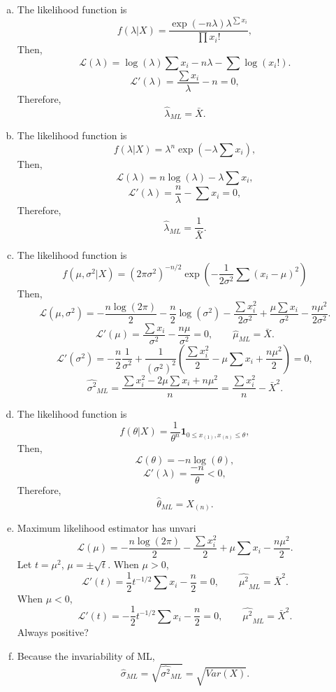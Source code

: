 \begin{solution}
    \begin{enumerate}[(a)]
        \item The likelihood function is 
        \[
            f(\lambda|X)=\frac{\exp(-n\lambda)\lambda^{\sum x_i}}{\prod x_i!}, 
        \]
        Then, 
        \[
            \mathcal{L}(\lambda)=\log(\lambda)\sum x_i-n\lambda-\sum \log(x_i!). 
        \]
        \[
            \mathcal{L}'(\lambda)=\frac{\sum x_i}{\lambda}-n=0, 
        \]
        Therefore, 
        \[
            \hat{\lambda}_{ML}=\bar{X}. 
        \]
        \item The likelihood function is 
        \[
            f(\lambda|X)=\lambda^n\exp\left(-\lambda\sum x_i\right), 
        \]
        Then, 
        \[
            \mathcal{L}(\lambda)=n\log(\lambda)-\lambda\sum x_i, 
        \]
        \[
            \mathcal{L}'(\lambda)=\frac{n}{\lambda}-\sum x_i=0, 
        \]
        Therefore, 
        \[
            \hat{\lambda}_{ML}=\frac{1}{\bar{X}}. 
        \]
        \item The likelihood function is 
        \[
            f(\mu, \sigma^2|X)=(2\pi\sigma^2)^{-n/2}\exp\left(-\frac{1}{2\sigma^2}\sum(x_i-\mu)^2\right)
        \]
        Then, 
        \[
            \mathcal{L}(\mu, \sigma^2) = -\frac{n\log(2\pi)}{2}-\frac{n}{2}\log(\sigma^2)-\frac{\sum x_i^2}{2\sigma^2}+\frac{\mu\sum x_i}{\sigma^2}-\frac{n\mu^2}{2\sigma^2}. 
        \]
        \[
            \mathcal{L}'(\mu)=\frac{\sum x_i}{\sigma^2}-\frac{n\mu}{\sigma^2}=0, \qquad \hat{\mu}_{ML}=\bar{X}. 
        \]
        \[
            \mathcal{L}'(\sigma^2)=-\frac{n}{2}\frac{1}{\sigma^2}+\frac{1}{(\sigma^2)^2}\left(\frac{\sum x_i^2}{2}-\mu\sum x_i+\frac{n\mu^2}{2}\right)=0, 
        \]
        \[
            \widehat{\sigma^2}_{ML}=\frac{\sum x_i^2-2\mu\sum x_i+n\mu^2}{n}=\frac{\sum x_i^2}{n}-\bar{X}^2. 
        \]
        \item The likelihood function is 
        \[
            f(\theta|X)=\frac{1}{\theta^n}\mathbf{1}_{0\leqslant x_{(1)}, x_{(n)}\leqslant\theta}, 
        \]
        Then, 
        \[
            \mathcal{L}(\theta)=-n\log(\theta), 
        \]
        \[
            \mathcal{L}'(\lambda)=\frac{-n}{\theta}<0, 
        \]
        Therefore, 
        \[
            \hat{\theta}_{ML}=X_{(n)}. 
        \]
        \item Maximum likelihood estimator has unvari
        \[
            \mathcal{L}(\mu) = -\frac{n\log(2\pi)}{2}-\frac{\sum x_i^2}{2}+\mu\sum x_i-\frac{n\mu^2}{2}. 
        \]
        Let $t=\mu^2$, $\mu=\pm\sqrt{t}$. When $\mu>0$, 
        \[
            \mathcal{L}'(t)=\frac{1}{2}t^{-1/2}\sum x_i-\frac{n}{2}=0, \qquad \widehat{\mu^2}_{ML}=\bar{X}^2. 
        \]
        When $\mu<0$, 
        \[
            \mathcal{L}'(t)=-\frac{1}{2}t^{-1/2}\sum x_i-\frac{n}{2}=0, \qquad \widehat{\mu^2}_{ML}=\bar{X}^2. 
        \]
        Always positive? 
        \item Because the invariability of ML, \[
            \widehat{\sigma}_{ML}=\sqrt{\widehat{\sigma^2}_{ML}}=\sqrt{Var(X)}. 
        \] 
    \end{enumerate}
\end{solution}

